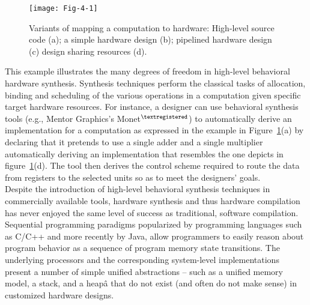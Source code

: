 \begin{figure}[htbp]
\centering
\texttt{[image: Fig-4-1]}
\caption{Variants of mapping a computation to hardware: High-level source 
code (a); a simple hardware design (b); pipelined hardware 
design (c) design sharing resources (d).} 
\label{fig:Fig.4.1}
\end{figure}

This example illustrates the many degrees of freedom in high-level
behavioral hardware synthesis. Synthesis techniques perform the
classical tasks of allocation, binding and scheduling of the various
operations in a computation given specific target hardware resources. 
For instance, a designer can use behavioral synthesis tools (e.g.,
Mentor Graphics's Monet$^{\textregistered}$) to automatically derive
an implementation for a computation as expressed in the example in
Figure~\ref{fig:Fig.4.1}(a) by declaring that it pretends to use a
single adder and a single multiplier automatically deriving an
implementation that resembles the one depicts in figure~\ref{fig:Fig.4.1}(d). 
The tool then derives the control scheme required to route the data from 
registers to the selected units so as to meet the designers' goals. 
\\

Despite the introduction of high-level behavioral synthesis techniques in 
commercially available tools, hardware synthesis and thus hardware
compilation has never enjoyed the same level of success as traditional,
software compilation. 
Sequential programming paradigms popularized by programming
languages such as C/C++ and more recently by Java, allow
programmers to easily reason about program behavior as a
sequence of program memory state transitions. The underlying
processors and the corresponding system-level implementations
present a number of simple unified abstractions -- such as a
unified memory model, a stack, and a heapâ that do not exist (and
often do not make sense) in customized hardware designs.\\

